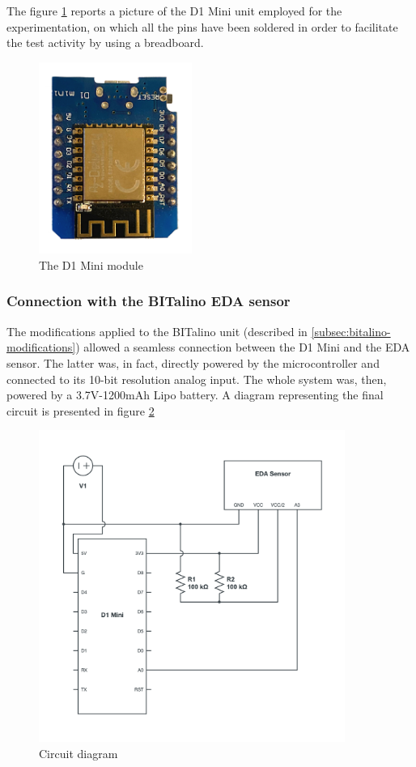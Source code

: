 The figure \ref{fig:d1mini} reports a picture of the D1 Mini unit employed for the experimentation, on which all the pins have been soldered in order to facilitate the test activity by using a breadboard.

\begin{figure}[h]
    \centering
    \includegraphics[width=5cm]{./images/d1mini.png}
    \caption{The D1 Mini module}
    \label{fig:d1mini}
\end{figure}

\subsubsection{Connection with the BITalino EDA sensor}\label{subsubsec:d1mini}

The modifications applied to the BITalino unit (described in \ref{subsec:bitalino-modifications}) allowed a seamless connection between the D1 Mini and the EDA sensor. The latter was, in fact, directly powered by the microcontroller and connected to its 10-bit resolution analog input. The whole system was, then, powered by a 3.7V-1200mAh Lipo battery. A diagram representing the final circuit is presented in figure \ref{fig:circuit-diagram}

\begin{figure}[h]
    \centering
    \includegraphics[width=10cm]{./images/circuit-diagram.png}
    \caption{Circuit diagram}
    \label{fig:circuit-diagram}
\end{figure}

